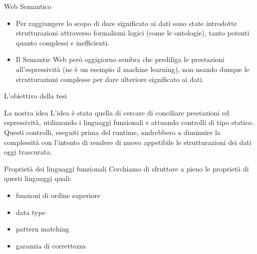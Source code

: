 \begin{frame}{Web Semantico}

    \begin{itemize}
        \item Per raggiungere lo scopo di dare significato ai dati sono state introdotte strutturazioni attraverso formalismi logici (come le ontologie), tanto potenti quanto complessi e inefficienti.
        
        \item Il Semantic Web però oggigiorno sembra che prediliga le prestazioni all'espressività (ne è un esempio il machine learning), non usando dunque le strutturazioni complesse per dare ulteriore significato ai dati. 
    \end{itemize}
        
\end{frame}
\begin{frame}{L'obiettivo della tesi}
        \begin{block}{La nostra idea}
            L'idea è stata quella di cercare di conciliare prestazioni ed espressività, utilizzando i linguaggi funzionali e attuando controlli di tipo statico. Questi controlli, eseguiti prima del runtime, andrebbero a diminuire la complessità con l'intento di rendere di nuovo appetibile le strutturazioni dei dati oggi trascurata.
        \end{block} 
        \begin{block}{Proprietà dei linguaggi funzionali}
            Cerchiamo di sfruttare a pieno le proprietà di questi linguaggi quali: 
            \begin{itemize}
                \item funzioni di ordine superiore
                \item data type
                \item pattern matching
                \item garanzia di correttezza
            \end{itemize}    
        \end{block}
\end{frame}